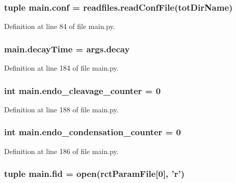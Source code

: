 \hypertarget{a00111_adc567db25548116293968a9102beab98}{
\subsubsection[{conf}]{\setlength{\rightskip}{0pt plus 5cm}tuple main.\-conf = readfiles.\-read\-Conf\-File({\bf tot\-Dir\-Name})}}\label{a00111_adc567db25548116293968a9102beab98}


Definition at line 84 of file main.\-py.

\hypertarget{a00111_a5517c07ae046c271d6291e9b3f7d139d}{
\subsubsection[{decay\-Time}]{\setlength{\rightskip}{0pt plus 5cm}main.\-decay\-Time = args.\-decay}}\label{a00111_a5517c07ae046c271d6291e9b3f7d139d}


Definition at line 184 of file main.\-py.

\hypertarget{a00111_a17b22b48a2afe0223186b4275fe5ba70}{
\subsubsection[{endo\-\_\-cleavage\-\_\-counter}]{\setlength{\rightskip}{0pt plus 5cm}int main.\-endo\-\_\-cleavage\-\_\-counter = 0}}\label{a00111_a17b22b48a2afe0223186b4275fe5ba70}


Definition at line 188 of file main.\-py.

\hypertarget{a00111_a0521d81d319c4d79433b5fb65a6da1c2}{
\subsubsection[{endo\-\_\-condensation\-\_\-counter}]{\setlength{\rightskip}{0pt plus 5cm}int main.\-endo\-\_\-condensation\-\_\-counter = 0}}\label{a00111_a0521d81d319c4d79433b5fb65a6da1c2}


Definition at line 186 of file main.\-py.

\hypertarget{a00111_a68ab0ffa4b5ff1cceff01f4abe686ad0}{
\subsubsection[{fid}]{\setlength{\rightskip}{0pt plus 5cm}tuple main.\-fid = open({\bf rct\-Param\-File}\mbox{[}0\mbox{]}, '{\bf r}')}}\label{a00111_a68ab0ffa4b5ff1cceff01f4abe686ad0}


